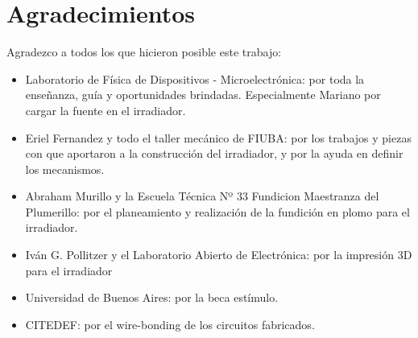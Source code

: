 \clearpage
\part*{Agradecimientos}
Agradezco a todos los que hicieron posible este trabajo:
\begin{itemize}
    \item Laboratorio de Física de Dispositivos - Microelectrónica: 
    por toda la enseñanza, guía y oportunidades brindadas.
    Especialmente Mariano por cargar la fuente en el irradiador.
    \item Eriel Fernandez y todo el taller mecánico de FIUBA: 
    por los trabajos y piezas con que aportaron a la construcción del
    irradiador, y por la ayuda en definir los mecanismos.
    \item Abraham Murillo y la Escuela Técnica Nº 33 Fundicion Maestranza del 
    Plumerillo:
    por el planeamiento y realización de la fundición en plomo para el
    irradiador.
    \item Iván G. Pollitzer y el Laboratorio Abierto de Electrónica:
    por la impresión 3D para el irradiador
    \item Universidad de Buenos Aires:
    por la beca estímulo.
    \item CITEDEF: por el wire-bonding de los circuitos fabricados.
\end{itemize}
\clearpage
